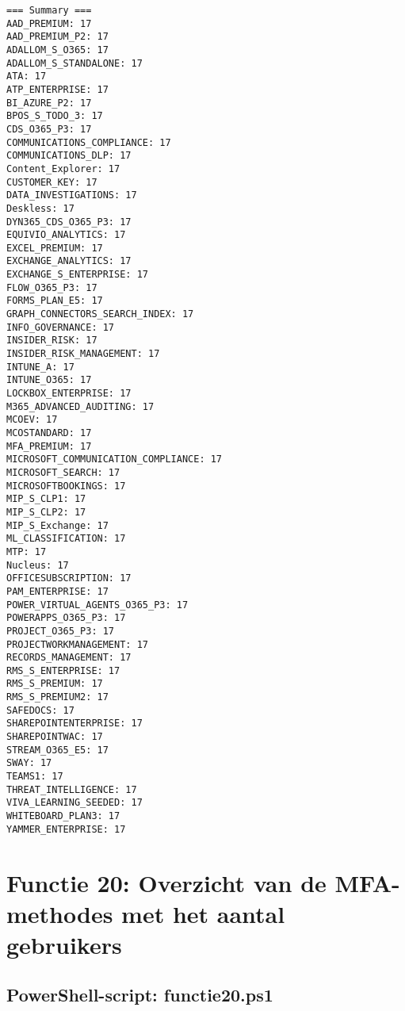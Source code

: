 \begin{tiny}
    \begin{verbatim}
=== Summary ===
AAD_PREMIUM: 17
AAD_PREMIUM_P2: 17
ADALLOM_S_O365: 17
ADALLOM_S_STANDALONE: 17
ATA: 17
ATP_ENTERPRISE: 17
BI_AZURE_P2: 17
BPOS_S_TODO_3: 17
CDS_O365_P3: 17
COMMUNICATIONS_COMPLIANCE: 17
COMMUNICATIONS_DLP: 17
Content_Explorer: 17
CUSTOMER_KEY: 17
DATA_INVESTIGATIONS: 17
Deskless: 17
DYN365_CDS_O365_P3: 17
EQUIVIO_ANALYTICS: 17
EXCEL_PREMIUM: 17
EXCHANGE_ANALYTICS: 17
EXCHANGE_S_ENTERPRISE: 17
FLOW_O365_P3: 17
FORMS_PLAN_E5: 17
GRAPH_CONNECTORS_SEARCH_INDEX: 17
INFO_GOVERNANCE: 17
INSIDER_RISK: 17
INSIDER_RISK_MANAGEMENT: 17
INTUNE_A: 17
INTUNE_O365: 17
LOCKBOX_ENTERPRISE: 17
M365_ADVANCED_AUDITING: 17
MCOEV: 17
MCOSTANDARD: 17
MFA_PREMIUM: 17
MICROSOFT_COMMUNICATION_COMPLIANCE: 17
MICROSOFT_SEARCH: 17
MICROSOFTBOOKINGS: 17
MIP_S_CLP1: 17
MIP_S_CLP2: 17
MIP_S_Exchange: 17
ML_CLASSIFICATION: 17
MTP: 17
Nucleus: 17
OFFICESUBSCRIPTION: 17
PAM_ENTERPRISE: 17
POWER_VIRTUAL_AGENTS_O365_P3: 17
POWERAPPS_O365_P3: 17
PROJECT_O365_P3: 17
PROJECTWORKMANAGEMENT: 17
RECORDS_MANAGEMENT: 17
RMS_S_ENTERPRISE: 17
RMS_S_PREMIUM: 17
RMS_S_PREMIUM2: 17
SAFEDOCS: 17
SHAREPOINTENTERPRISE: 17
SHAREPOINTWAC: 17
STREAM_O365_E5: 17
SWAY: 17
TEAMS1: 17
THREAT_INTELLIGENCE: 17
VIVA_LEARNING_SEEDED: 17
WHITEBOARD_PLAN3: 17
YAMMER_ENTERPRISE: 17
    \end{verbatim}
\end{tiny}

\clearpage

\section{Functie 20: Overzicht van de MFA-methodes met het aantal gebruikers}

\subsection{PowerShell-script: functie20.ps1}

